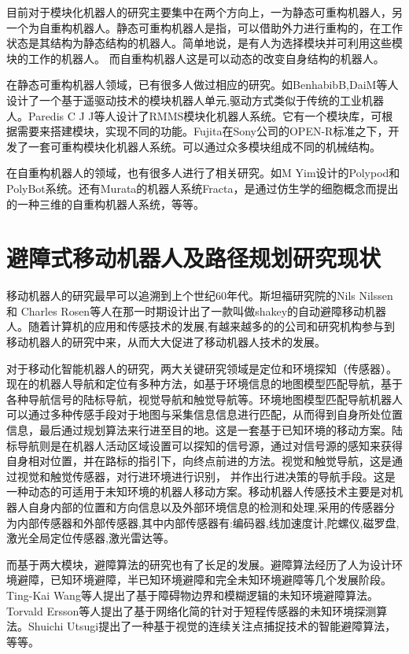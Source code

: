 目前对于模块化机器人的研究主要集中在两个方向上，一为静态可重构机器人，另一个为自重构机器人。静态可重构机器人是指，可以借助外力进行重构的，在工作状态是其结构为静态结构的机器人。简单地说，是有人为选择模块并可利用这些模块的工作的机器人。 而自重构机器人这是可以动态的改变自身结构的机器人。

在静态可重构机器人领域，已有很多人做过相应的研究。如BenhabibB,DaiM等人设计了一个基于遥驱动技术的模块机器人单元,驱动方式类似于传统的工业机器人。Paredis C J J等人设计了RMMS模块化机器人系统。它有一个模块库，可根据需要来搭建模块，实现不同的功能。Fujita在Sony公司的OPEN-R标准之下，开发了一套可重构模块化机器人系统。可以通过众多模块组成不同的机械结构。 

在自重构机器人的领域，也有很多人进行了相关研究。如M Yim设计的Polypod和PolyBot系统。还有Murata的机器人系统Fracta，是通过仿生学的细胞概念而提出的一种三维的自重构机器人系统，等等。

\section{避障式移动机器人及路径规划研究现状}
移动机器人的研究最早可以追溯到上个世纪60年代。斯坦福研究院的Nils Nilssen和 Charles Rosen等人在那一时期设计出了一款叫做shakey的自动避障移动机器人。随着计算机的应用和传感技术的发展,有越来越多的的公司和研究机构参与到移动机器人的研究中来，从而大大促进了移动机器人技术的发展。 

对于移动化智能机器人的研究，两大关键研究领域是定位和环境探知（传感器）。现在的机器人导航和定位有多种方法，如基于环境信息的地图模型匹配导航，基于各种导航信号的陆标导航，视觉导航和触觉导航等。环境地图模型匹配导航机器人可以通过多种传感手段对于地图与采集信息信息进行匹配，从而得到自身所处位置信息，最后通过规划算法来行进至目的地。这是一套基于已知环境的移动方案。陆标导航则是在机器人活动区域设置可以探知的信号源，通过对信号源的感知来获得自身相对位置，并在路标的指引下，向终点前进的方法。视觉和触觉导航，这是通过视觉和触觉传感器，对行进环境进行识别， 并作出行进决策的导航手段。这是一种动态的可适用于未知环境的机器人移动方案。移动机器人传感技术主要是对机器人自身内部的位置和方向信息以及外部环境信息的检测和处理,采用的传感器分为内部传感器和外部传感器,其中内部传感器有:编码器,线加速度计,陀螺仪,磁罗盘,激光全局定位传感器,激光雷达等。 

而基于两大模块，避障算法的研究也有了长足的发展。避障算法经历了人为设计环境避障，已知环境避障，半已知环境避障和完全未知环境避障等几个发展阶段。Ting-Kai Wang等人提出了基于障碍物边界和模糊逻辑的未知环境避障算法。Torvald Ersson等人提出了基于网络化简的针对于短程传感器的未知环境探测算法。Shuichi Utsugi提出了一种基于视觉的连续关注点捕捉技术的智能避障算法，等等。 

